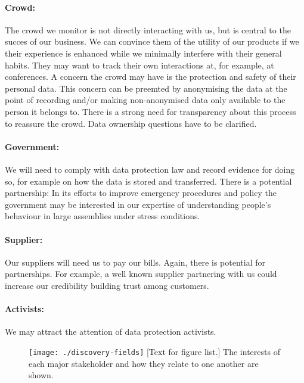 \documentclass[12pt, oneside]{article}
\begin{document}
\paragraph{Crowd:} The crowd we monitor is not directly interacting with us, but is central to the succes of our business. We can convince them of the utility of our products if we their experience is enhanced while we minimally interfere with their general habits. They may want to track their own interactions at, for example, at conferences. A concern the crowd may have is the protection and safety of their personal data. This concern can be preemted by anonymising the data at the point of recording and/or making non-anonymised data only available to the person it belongs to. There is a strong need for transparency about this process to reassure the crowd. Data ownership questions have to be clarified.

\paragraph{Government:} We will need to comply with data protection law and record evidence for doing so, for example on how the data is stored and transferred. There is a potential partnership: In its efforts to improve emergency procedures and policy the government may be interested in our expertise of understanding people's behaviour in large assemblies under stress conditions.

\paragraph{Supplier:} Our suppliers will need us to pay our bills. Again, there is potential for partnerships. For example, a well known supplier partnering with us could increase our credibility building trust among customers. 

\paragraph{Activists:} We may attract the attention of data protection activists.

\begin{figure}
\centering
\texttt{[image: ./discovery-fields]}
{[Text for figure list.]{\label{fig:fields} 
The interests of each major stakeholder and how they relate to one another are shown.}}
\end{figure}
\end{document}
